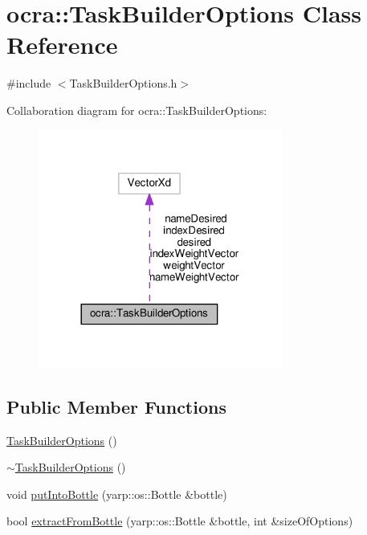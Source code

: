 \hypertarget{classocra_1_1TaskBuilderOptions}{}\section{ocra\+:\+:Task\+Builder\+Options Class Reference}
\label{classocra_1_1TaskBuilderOptions}


{\ttfamily \#include $<$Task\+Builder\+Options.\+h$>$}



Collaboration diagram for ocra\+:\+:Task\+Builder\+Options\+:
\nopagebreak
\begin{figure}[H]
\begin{center}
\leavevmode
\includegraphics[width=228pt]{d8/de3/classocra_1_1TaskBuilderOptions__coll__graph}
\end{center}
\end{figure}
\subsection*{Public Member Functions}
\begin{DoxyCompactItemize}
\item 
\hyperlink{classocra_1_1TaskBuilderOptions_a99045de3fc12a569cb9a2bf6b60bbc34}{Task\+Builder\+Options} ()
\item 
\hyperlink{classocra_1_1TaskBuilderOptions_a25342a6bc49b3d63c9e512e73ff1721c}{$\sim$\+Task\+Builder\+Options} ()
\item 
void \hyperlink{classocra_1_1TaskBuilderOptions_abc99093a68bc991fa711aa6a7e55506a}{put\+Into\+Bottle} (yarp\+::os\+::\+Bottle \&bottle)
\item 
bool \hyperlink{classocra_1_1TaskBuilderOptions_a60271152310747f327d76d1f6557df4c}{extract\+From\+Bottle} (yarp\+::os\+::\+Bottle \&bottle, int \&size\+Of\+Options)
\end{DoxyCompactItemize}
